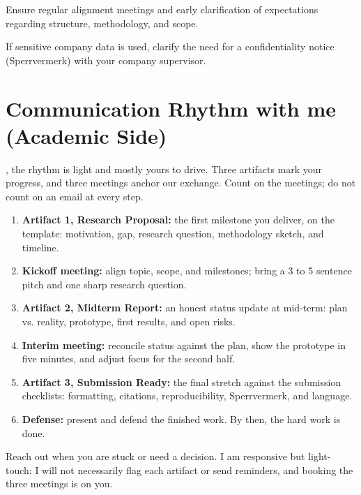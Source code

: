 \documentclass{../sharedAssets/tufte}
\begin{document}
Ensure regular alignment meetings and early clarification of expectations regarding structure, methodology, and scope.

If sensitive company data is used, clarify the need for a confidentiality notice (Sperrvermerk) with your company supervisor.


\section{Communication Rhythm with me (Academic Side)}
, the rhythm is light and mostly yours to drive. Three artifacts mark your progress, and three meetings anchor our exchange. Count on the meetings; do not count on an email at every step.

\begin{enumerate}
    \item \textbf{Artifact 1, Research Proposal:} the first milestone you deliver, on the template: motivation, gap, research question, methodology sketch, and timeline.
    \item \textbf{Kickoff meeting:} align topic, scope, and milestones; bring a 3 to 5 sentence pitch and one sharp research question.
    \item \textbf{Artifact 2, Midterm Report:} an honest status update at mid-term: plan vs. reality, prototype, first results, and open risks.
    \item \textbf{Interim meeting:} reconcile status against the plan, show the prototype in five minutes, and adjust focus for the second half.
    \item \textbf{Artifact 3, Submission Ready:} the final stretch against the submission checklists: formatting, citations, reproducibility, Sperrvermerk, and language.
    \item \textbf{Defense:} present and defend the finished work. By then, the hard work is done.
\end{enumerate}

 Reach out when you are stuck or need a decision. I am responsive but light-touch: I will not necessarily flag each artifact or send reminders, and booking the three meetings is on you.
\end{document}
